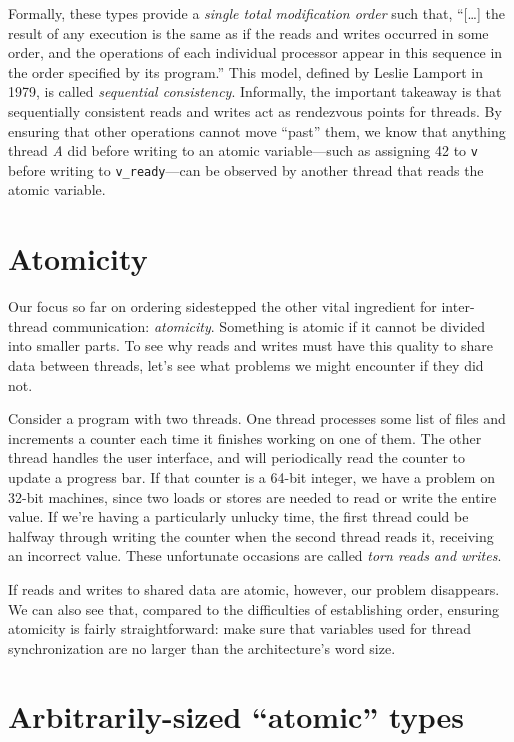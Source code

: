 \documentclass[fontsize=10pt, numbers=endperiod]{scrartcl}
\newcommand{\monobox}[1]{\mbox{\texttt{#1}}}
\newcommand{\introduce}[1]{\textit{#1}}
\begin{document}
\begin{multicols}{2}
Formally, these types provide a \textit{single total modification order}
such that,
``[\ldots] the result of any execution is the same as if the reads and writes
occurred in some order, and the operations of each individual
processor appear in this sequence in the order specified by its program.''
This model, defined by Leslie Lamport in 1979,
is called \introduce{sequential consistency}.
Informally, the important takeaway is that sequentially consistent reads
and writes act as rendezvous points for threads.
By ensuring that other operations cannot move ``past'' them,
we know that anything thread \textit{A} did before writing to an atomic
variable---such as assigning 42 to \texttt{v} before writing to
\monobox{v\_ready}---can be observed by another thread that reads the
atomic variable.

\section{Atomicity}
\label{atomicity}

Our focus so far on ordering sidestepped the other vital ingredient for
inter-thread communication: \introduce{atomicity}.
Something is atomic if it cannot be divided into smaller parts.
To see why reads and writes must have this quality to share data between threads,
let's see what problems we might encounter if they did not.

Consider a program with two threads.
One thread processes some list of files
and increments a counter each time it finishes working on one of them.
The other thread handles the user interface, and will periodically read
the counter to update a progress bar.
If that counter is a 64-bit integer, we have a problem on 32-bit machines,
since two loads or stores are needed to read or write the entire value.
If we're having a particularly unlucky time,
the first thread could be halfway through writing the counter
when the second thread reads it, receiving an incorrect value.
These unfortunate occasions are called \introduce{torn reads and writes}.

If reads and writes to shared data are atomic, however,
our problem disappears.
We can also see that, compared to the difficulties of establishing order,
ensuring atomicity is fairly straightforward:
make sure that variables used for thread synchronization are no larger than
the architecture's word size.

\section{Arbitrarily-sized “atomic” types}


\end{multicols}
\end{document}
